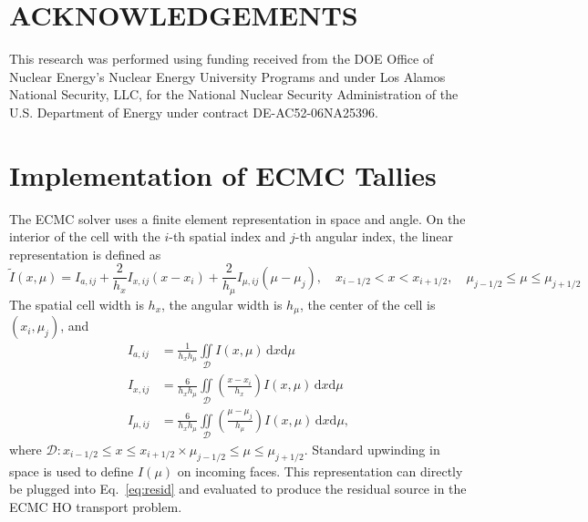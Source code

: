 \documentclass{mc2013}
\renewcommand{\d}{\mathrm{d}}
\newcommand{\il}{{i-1/2}}
\newcommand{\ir}{{i+1/2}}
\newcommand{\jl}{{j-1/2}}
\newcommand{\jr}{{j+1/2}}
\begin{document}
\section*{ACKNOWLEDGEMENTS}

This research was performed using funding received from the DOE Office of Nuclear
Energy's Nuclear Energy University Programs and under Los Alamos National Security,
LLC, for the National Nuclear Security Administration of the U.S. Department of
Energy under contract DE-AC52-06NA25396. 


\setlength{\baselineskip}{12pt}


\clearpage
\appendix

\section{Implementation of ECMC Tallies}

The ECMC solver uses a finite element representation in space and angle. On the
interior of the cell with the $i$-th spatial index and $j$-th angular index, the linear representation is defined as
\begin{equation*}
    \tilde I(x,\mu) = I_{a,ij} + \frac{2}{h_x}I_{x,ij}\left(x-x_i\right) +
    \frac{2}{h_\mu}I_{\mu,ij}\left(\mu-\mu_j\right), \quad x_\il <  x < x_\ir,\quad
     \mu_\jl \leq \mu \leq \mu_\jr
\end{equation*}
The spatial cell width is $h_x$, the angular width is
$h_\mu$, the center of the cell is $(x_i,\mu_j)$, and
\begin{align}\label{app1}
    I_{a,ij} &= \frac{1}{h_x h_\mu} \iint\limits_{\mathcal{D}} I(x,\mu)\, \d x \d \mu \\
    I_{x,ij} &= \frac{6}{h_xh_\mu}\iint\limits_{\mathcal{D}} \left(\frac{x - x_i}{h_{x}}\right)
    I(x,\mu)\, \d x \d \mu \\ \label{app2}
    I_{\mu,ij} &= \frac{6}{h_xh_\mu}\iint\limits_{\mathcal{D}}
     \left(\frac{\mu - \mu_j}{h_{\mu}}\right)
    I(x,\mu)\, \d x \d \mu,
\end{align}
where $\mathcal{D}: x_\il \leq  x \leq  x_\ir \times \mu_\jl \leq \mu \leq \mu_\jr$.
Standard upwinding in space is used to
define $I(\mu)$  on incoming faces. This representation can directly be plugged into
Eq.~\eqref{eq:resid} and evaluated to produce the residual source in the ECMC HO transport
problem. 
\end{document}
